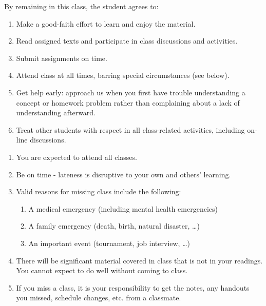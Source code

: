 \documentclass[a4paper,landscape,headrule,footrule]{foils}
\begin{document}








By remaining in this class, the student agrees to:
\begin{enumerate}
\item  Make a good-faith effort to learn and enjoy the material.
\item  Read assigned texts and participate in class discussions and activities.
\item Submit assignments on time.
\item Attend class at all times, barring special circumstances (see below).
\item Get help early: approach us when you first have trouble understanding a concept or homework problem rather than complaining about a lack of understanding afterward.
\item Treat other students with respect in all class-related activities, including on-line discussions.
\end{enumerate}
\begin{enumerate}
\item You are expected to attend all classes.
\item Be on time - lateness is disruptive to your own and others' learning.
\item Valid reasons for missing class include the following:
\begin{enumerate}
\item A medical emergency (including mental health emergencies)
\item A family emergency (death, birth, natural disaster,  \ldots{})
\item An important event (tournament, job interview, \ldots{})
\end{enumerate}
\item There will be significant material covered in class that is not in your readings.  You cannot expect to do well without coming to class.
\item If you miss a class, it is your responsibility to get the notes, any handouts you missed, schedule changes, etc. from a classmate.
\end{enumerate}
\end{document}
